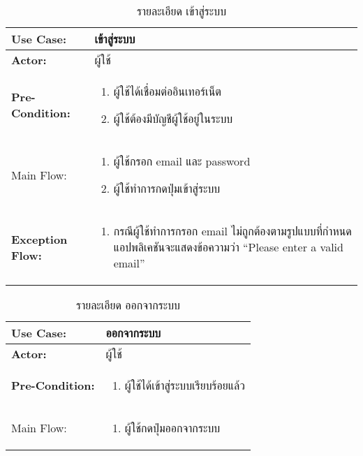 \begin{table}
    \caption{รายละเอียด เข้าสู่ระบบ}
    \begin{tabularx}{\textwidth}{ | >{\centering\bf} p{3cm} | X |}
        \hline
        Use Case: & เข้าสู่ระบบ \\\hline
        Actor: & ผู้ใช้ \\\hline
        Pre-Condition: &
        \begin{enumerate}[table]
            \item ผู้ใช้ได้เชื่อมต่ออินเทอร์เน็ต
            \item ผู้ใช้ต้องมีบัญชีผู้ใช้อยู่ในระบบ
        \end{enumerate} \\\hline
        
        Main Flow: & 
        \begin{enumerate}[table]
            \item ผู้ใช้กรอก email และ password
            \item ผู้ใช้ทำการกดปุ่มเข้าสู่ระบบ
        \end{enumerate}\\\hline
        Exception Flow: & 
        \begin{enumerate}[table]
            \item กรณีผู้ใช้ทำการกรอก email ไม่ถูกต้องตามรูปแบบที่กำหนด แอปพลิเคชันจะแสดงข้อความว่า “Please enter a valid email”
        \end{enumerate}\\\hline
    \end{tabularx}
\end{table}


\begin{table}
    \caption{รายละเอียด ออกจากระบบ}
    \begin{tabularx}{\textwidth}{ | >{\centering\bf} p{3cm} | X |}
        \hline
        Use Case: & ออกจากระบบ \\\hline
        Actor: & ผู้ใช้ \\\hline
        Pre-Condition: &
        \begin{enumerate}[table]
            \item ผู้ใช้ได้เข้าสู่ระบบเรียบร้อยแล้ว
        \end{enumerate} \\\hline
        
        Main Flow: & 
        \begin{enumerate}[table]
            \item ผู้ใช้กดปุ่มออกจากระบบ
        \end{enumerate}\\\hline
    \end{tabularx}
\end{table}

